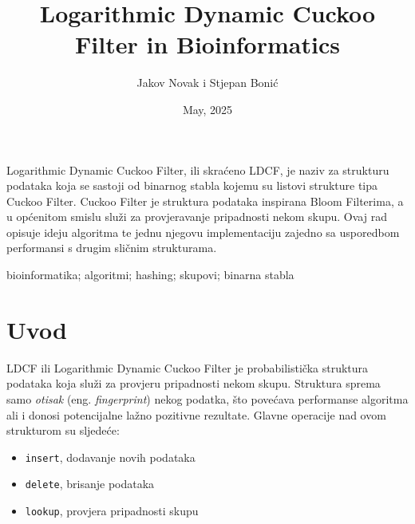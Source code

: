\documentclass[seminarskirad]{fer}
\title{Logarithmic Dynamic Cuckoo Filter in Bioinformatics}
\author{Jakov Novak i Stjepan Bonić}
\date{May, 2025}
\begin{document}
\maketitle


\mainmatter



\begin{sazetak}
  Logarithmic Dynamic Cuckoo Filter, ili skraćeno LDCF, je naziv za strukturu podataka koja se sastoji od binarnog stabla kojemu su listovi strukture tipa Cuckoo Filter. Cuckoo Filter je struktura podataka inspirana Bloom Filterima, a u općenitom smislu služi za provjeravanje pripadnosti nekom skupu. Ovaj rad opisuje ideju algoritma te jednu njegovu implementaciju zajedno sa usporedbom performansi s drugim sličnim strukturama.
\end{sazetak}

\begin{kljucnerijeci}
  bioinformatika; algoritmi; hashing; skupovi; binarna stabla
\end{kljucnerijeci}


\tableofcontents


\chapter{Uvod}

LDCF ili Logarithmic Dynamic Cuckoo Filter je probabilistička struktura podataka koja služi za provjeru pripadnosti nekom skupu.
Struktura sprema samo \textit{otisak} (eng. \textit{fingerprint}) nekog podatka, što povećava performanse algoritma ali i
donosi potencijalne lažno pozitivne rezultate. Glavne operacije nad ovom strukturom su sljedeće:

\begin{itemize}
  \item \texttt{insert}, dodavanje novih podataka
  \item \texttt{delete}, brisanje podataka
  \item \texttt{lookup}, provjera pripadnosti skupu
\end{itemize}
\end{document}
